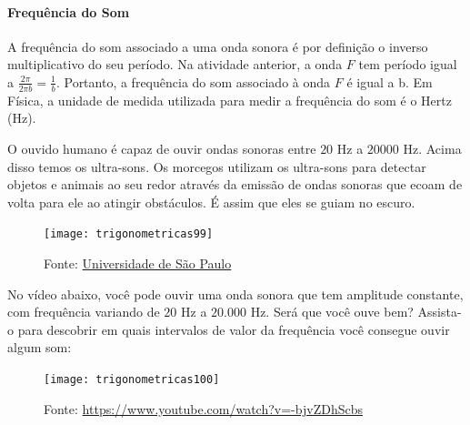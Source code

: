 \begin{knowledge}
\label{trig-knowledge3}
\vspace{-2\parskip}
\paragraph{Frequência do Som}

A frequência do som associado a uma onda sonora é por definição o inverso multiplicativo do seu período. Na atividade anterior, a onda $F$ tem período igual a $\frac{2\pi}{2\pi b}=\frac{1}{b}$. Portanto, a frequência do som associado à onda $F$ é igual a b. Em Física, a unidade de medida utilizada para medir a frequência do som é o Hertz (Hz).

O ouvido humano é capaz de ouvir ondas sonoras entre $20$ Hz a $20000$ Hz. Acima disso temos os ultra-sons. Os morcegos utilizam os ultra-sons para detectar objetos e animais ao seu redor através da emissão de ondas sonoras que ecoam de volta para ele ao atingir obstáculos. É assim que eles se guiam no escuro.

\begin{figure}[H]
\centering

\texttt{[image: trigonometricas99]}
\caption{Fonte: \href{https://sites.usp.br/nupic/wp-content/uploads/sites/293/2017/11/M\%c3\%b3dulo-de-Ensino-OFICIAL.pdf}{Universidade de São Paulo}}
\label{}
\end{figure}

No vídeo abaixo, você pode ouvir uma onda sonora que tem amplitude constante, com frequência variando de $20$ Hz a $20.000$ Hz. Será que você ouve bem? Assista-o para descobrir em quais intervalos de valor da frequência você consegue ouvir algum som:

\begin{figure}[H]
\centering

\texttt{[image: trigonometricas100]}
\caption{Fonte: \url{https://www.youtube.com/watch?v=-bjvZDhScbs}}
\end{figure}

\end{knowledge}
\clearpage

